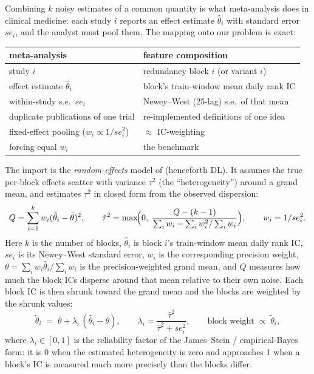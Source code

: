 \documentclass[11pt]{article}
\begin{document}
Combining $k$ noisy estimates of a common quantity is what meta-analysis does in clinical
medicine: each study $i$ reports an effect estimate $\hat\theta_i$ with standard error
$se_i$, and the analyst must pool them. The mapping onto our problem is exact:

\begin{center}
\small
\begin{tabular}{ll}
\toprule
meta-analysis & feature composition \\
\midrule
study $i$ & redundancy block $i$ (or variant $i$) \\
effect estimate $\hat\theta_i$ & block's train-window mean daily rank IC \\
within-study s.e.\ $se_i$ & Newey--West (25-lag) s.e.\ of that mean \\
duplicate publications of one trial & re-implemented definitions of one idea \\
fixed-effect pooling ($w_i \propto 1/se_i^2$) & $\approx$ IC-weighting \\
forcing equal $w_i$ & the benchmark \\
\bottomrule
\end{tabular}
\end{center}

The import is the \emph{random-effects} model of \citet{dersimonian1986} (henceforth DL). It
assumes the true per-block effects scatter with variance $\tau^2$ (the ``heterogeneity'')
around a grand mean, and estimates $\tau^2$ in closed form from the observed dispersion:
\begin{equation}
Q=\sum_{i=1}^{k} w_i(\hat\theta_i-\bar\theta)^2,\qquad
\hat\tau^2=\max\!\Bigl(0,\;
\frac{Q-(k-1)}{\sum_i w_i-\sum_i w_i^2/\sum_i w_i}\Bigr),\qquad w_i=1/se_i^2 .
\label{eq:dl}
\end{equation}
Here $k$ is the number of blocks, $\hat\theta_i$ is block $i$'s train-window mean daily
rank IC, $se_i$ is its Newey--West standard error, $w_i$ is the corresponding
precision weight, $\bar\theta=\sum_i w_i\hat\theta_i/\sum_i w_i$ is the
precision-weighted grand mean, and $Q$ measures how much the block ICs disperse around
that mean relative to their own noise. Each block IC is then shrunk toward the grand mean
and the blocks are weighted by the shrunk values:
\begin{equation}
\tilde\theta_i \;=\; \bar\theta + \lambda_i\,(\hat\theta_i-\bar\theta),
\qquad
\lambda_i=\frac{\hat\tau^2}{\hat\tau^2+se_i^2},
\qquad
\text{block weight} \;\propto\; \tilde\theta_i ,
\label{eq:dl-shrink}
\end{equation}
where $\lambda_i \in [0,1]$ is the reliability factor of the James--Stein /
empirical-Bayes form: it is 0 when the estimated heterogeneity is zero and approaches 1
when a block's IC is measured much more precisely than the blocks differ.
\end{document}
